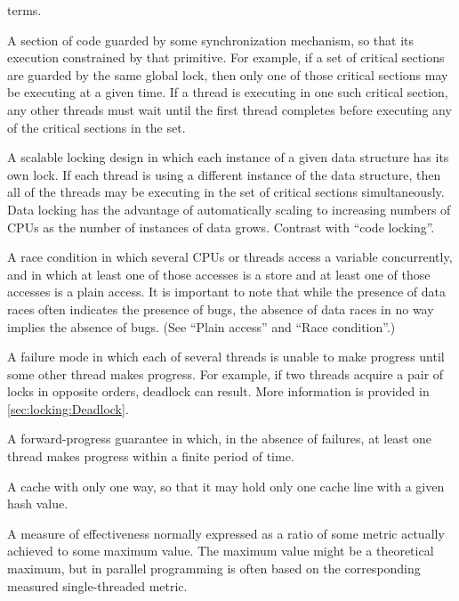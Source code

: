 \begin{description}
	terms.
\item[\IXG{Critical Section}:]
	A section of code guarded by some synchronization mechanism,
	so that its execution constrained by that primitive.
	For example, if a set of critical sections are guarded by
	the same global lock, then only one of those critical sections
	may be executing at a given time.
	If a thread is executing in one such critical section,
	any other threads must wait until the first thread completes
	before executing any of the critical sections in the set.
\item[\IXGh{Data}{Locking}:]
	A scalable locking design in which each instance of a given
	data structure has its own lock.
	If each thread is using a different instance of the
	data structure, then all of the threads may be executing in
	the set of critical sections simultaneously.
	Data locking has the advantage of automatically scaling to
	increasing numbers of CPUs as the number of instances of
	data grows.
	Contrast with ``code locking''.
\item[\IXG{Data Race}:]
	A race condition in which several CPUs or threads access
	a variable concurrently, and in which at least one of those
	accesses is a store and at least one of those accesses
	is a plain access.
	It is important to note that while the presence of data races
	often indicates the presence of bugs, the absence of data races
	in no way implies the absence of bugs.
	(See ``Plain access'' and ``Race condition''.)
\item[\IXG{Deadlock}:]
	A failure mode in which each of several threads is unable to
	make progress until some other thread makes progress.
	For example, if two threads acquire a pair of locks in opposite
	orders, deadlock can result.
	More information is provided in
	\cref{sec:locking:Deadlock}.
\item[\IXG{Deadlock Free}:]
	A forward-progress guarantee in which, in the absence of
	failures, at least one thread makes progress within a finite
	period of time.
\item[\IXGh{Direct-Mapped}{Cache}:]
	A cache with only one way, so that it may hold only one cache
	line with a given hash value.
\item[\IXG{Efficiency}:]
	A measure of effectiveness normally expressed as a ratio
	of some metric actually achieved to some maximum value.
	The maximum value might be a theoretical maximum, but in
	parallel programming is often based on the corresponding
	measured single-threaded metric.
\item[\IXG{Embarrassingly Parallel}:]

\end{description}

